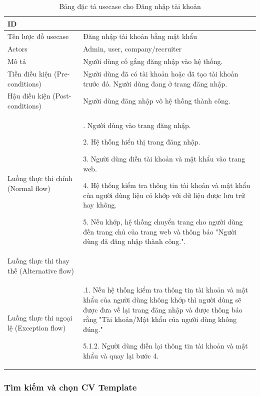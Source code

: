 \begin{table}[H]
    \centering
    \begin{tabular}{|>{\centering\arraybackslash}p{0.3\linewidth}|>{\raggedright\arraybackslash}p{0.7\linewidth}|} \hline 
         ID
& 2\\ \hline 
         Tên lược đồ usecase
& Đăng nhập tài khoản bằng mật khẩu\\ \hline 
         Actors
& Admin, user, company/recruiter\\ \hline 
         Mô tả
& Người dùng cố gắng đăng nhập vào hệ thống.\\ \hline 
         Tiền điều kiện (Pre-conditions)
& Người dùng đã có tài khoản hoặc đã tạo tài khoản trước đó.
Người dùng đang ở trang đăng nhập.\\ \hline 
         Hậu điều kiện (Post-conditions)
& Người dùng đăng nhập vô hệ thống thành công.\\ \hline 
         Luồng thực thi chính (Normal flow)
& 1. Người dùng vào trang đăng nhập.

2. Hệ thống hiển thị trang đăng nhập.

3. Người dùng điền tài khoản và mật khẩu vào trang web.

4. Hệ thống kiểm tra thông tin tài khoản và mật khẩu của người dùng liệu có khớp với dữ liệu được lưu trữ hay không.

5. Nếu khớp, hệ thống chuyển trang cho người dùng đến trang chủ của trang web và thông báo "Người dùng đã đăng nhập thành công.".\\ \hline 
         Luồng thực thi thay thế (Alternative flow)
& \\ \hline
 Luồng thực thi ngoại lệ (Exception flow)&5.1.1. Nếu hệ thống kiểm tra thông tin tài khoản và mật khẩu của người dùng không khớp thì người dùng sẽ được đưa về lại trang đăng nhập và được thông báo rằng "Tài khoản/Mật khẩu của người dùng không đúng."

5.1.2. Người dùng điền lại thông tin tài khoản và mật khẩu và quay lại bước 4.\\\hline
    \end{tabular}
    \caption{Bảng đặc tả usecase cho Đăng nhập tài khoản}
    \label{tab:Đăng nhập tài khoản}
\end{table}


\subsubsection{Tìm kiếm và chọn CV Template}

